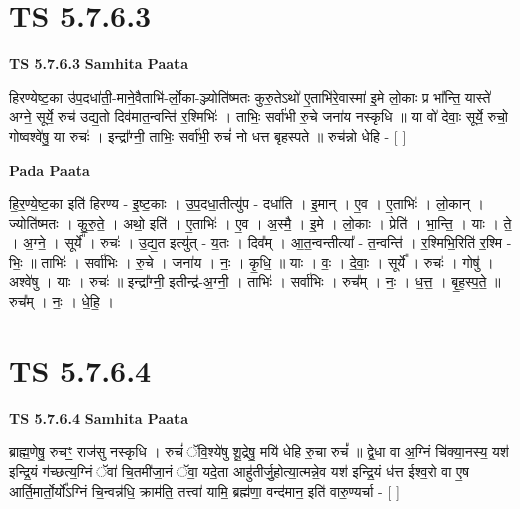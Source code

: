 \documentclass[17pt]{extarticle}
\begin{document}

\section{ TS 5.7.6.3 }

\textbf{TS 5.7.6.3 } \newline
\textbf{Samhita Paata} \newline

हिरण्येष्ट॒का उ॑प॒दधा॑ती॒-माने॒वैताभि॑-र्लो॒का-ञ्ज्योति॑ष्मतः कुरु॒तेऽथो॑ ए॒ताभि॑रे॒वास्मा॑ इ॒मे लो॒काः प्र भा᳚न्ति॒ यास्ते॑ अग्ने॒ सूर्ये॒ रुच॑ उद्य॒तो दिव॑मात॒न्वन्ति॑ र॒श्मिभिः॑ । ताभिः॒ सर्वा॑भी रु॒चे जना॑य नस्कृधि ॥ या वो॑ देवाः॒ सूर्ये॒ रुचो॒ गोष्वश्वे॑षु॒ या रुचः॑ । इन्द्रा᳚ग्नी॒ ताभिः॒ सर्वा॑भी॒ रुचं॑ नो धत्त बृहस्पते ॥ रुच॑न्नो धेहि - [  ] \newline

\textbf{Pada Paata} \newline

हि॒र॒ण्ये॒ष्ट॒का इति॑ हिरण्य - इ॒ष्ट॒काः । उ॒प॒दधा॒तीत्यु॑प - दधा॑ति । इ॒मान् । ए॒व । ए॒ताभिः॑ । लो॒कान् । ज्योति॑ष्मतः । कु॒रु॒ते॒ । अथो॒ इति॑ । ए॒ताभिः॑ । ए॒व । अ॒स्मै॒ । इ॒मे । लो॒काः । प्रेति॑ । भा॒न्ति॒ । याः । ते॒ । अ॒ग्ने॒ । सूर्ये᳚ । रुचः॑ । उ॒द्य॒त इत्यु॑त् - य॒तः । दिव᳚म् । आ॒त॒न्वन्तीत्या᳚ - त॒न्वन्ति॑ । र॒श्मिभि॒रिति॑ र॒श्मि - भिः॒ ॥ ताभिः॑ । सर्वा॑भिः । रु॒चे । जना॑य । नः॒ । कृ॒धि॒ ॥ याः । वः॒ । दे॒वाः॒ । सूर्ये᳚ । रुचः॑ । गोषु॑ । अश्वे॑षु । याः । रुचः॑ ॥ इन्द्रा᳚ग्नी॒ इतीन्द्र॑-अ॒ग्नी॒ । ताभिः॑ । सर्वा॑भिः । रुच᳚म् । नः॒ । ध॒त्त॒ । बृ॒ह॒स्प॒ते॒ ॥ रुच᳚म् । नः॒ । धे॒हि॒ ।  \newline





\section{ TS 5.7.6.4 }

\textbf{TS 5.7.6.4 } \newline
\textbf{Samhita Paata} \newline

ब्राह्म॒णेषु॒ रुचꣳ॒॒ राज॑सु नस्कृधि । रुचं॑ ॅवि॒श्ये॑षु शू॒द्रेषु॒ मयि॑ धेहि रु॒चा रुचं᳚ ॥ द्वे॒धा वा अ॒ग्निं चि॑क्या॒नस्य॒ यश॑ इन्द्रि॒यं ग॑च्छत्य॒ग्निं ॅवा॑ चि॒तमी॑जा॒नं ॅवा॒ यदे॒ता आहु॑तीर्जु॒होत्या॒त्मन्ने॒व यश॑ इन्द्रि॒यं ध॑त्त ईश्व॒रो वा ए॒ष आर्ति॒मार्तो॒र्यो᳚ऽग्निं चि॒न्वन्न॑धि॒ क्राम॑ति॒ तत्त्वा॑ यामि॒ ब्रह्म॑णा॒ वन्द॑मान॒ इति॑ वारु॒ण्यर्चा - [  ] \newline
\end{document}

